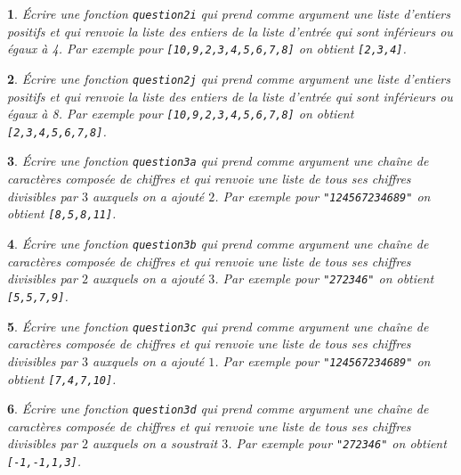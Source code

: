 \documentclass[10pt]{article}
\newtheorem{exi}{}
\newenvironment{exo}{\begin{exi}\em}{\end{exi}}
\begin{document}
\vspace*{-2ex}
\begin{exo}
    Écrire une fonction {\tt question2i} qui prend comme argument une liste d'entiers positifs et qui renvoie la liste des entiers de la liste d'entrée qui sont
inférieurs ou égaux à 4. Par exemple pour \verb+[10,9,2,3,4,5,6,7,8]+
on obtient \verb+[2,3,4]+.
\end{exo}
\vspace*{-2ex}
\begin{exo}
    Écrire une fonction {\tt question2j} qui prend comme argument une liste d'entiers positifs et qui renvoie la liste des entiers de la liste d'entrée qui sont
inférieurs ou égaux à 8. Par exemple pour \verb+[10,9,2,3,4,5,6,7,8]+
on obtient \verb+[2,3,4,5,6,7,8]+.
\end{exo}
\vspace*{-2ex}
\begin{exo}
    Écrire une fonction {\tt question3a} qui prend comme argument une chaîne de
caractères composée de chiffres
et qui renvoie une liste de tous ses chiffres divisibles par $3$
auxquels on a ajouté $2$. Par
exemple pour \verb+"124567234689"+ on obtient \verb+[8,5,8,11]+.
\end{exo}
\vspace*{-2ex}
\begin{exo}
    Écrire une fonction {\tt question3b} qui prend comme argument une chaîne de
caractères composée de chiffres
et qui renvoie une liste de tous ses chiffres divisibles par $2$
auxquels on a ajouté $3$. Par
exemple pour \verb+"272346"+ on obtient \verb+[5,5,7,9]+.
\end{exo}
\vspace*{-2ex}
\begin{exo}
    Écrire une fonction {\tt question3c} qui prend comme argument une chaîne de
caractères composée de chiffres
et qui renvoie une liste de tous ses chiffres divisibles par $3$
auxquels on a ajouté $1$. Par
exemple pour \verb+"124567234689"+ on obtient \verb+[7,4,7,10]+.
\end{exo}
\vspace*{-2ex}
\begin{exo}
    Écrire une fonction {\tt question3d} qui prend comme argument une chaîne de
caractères composée de chiffres
et qui renvoie une liste de tous ses chiffres divisibles par $2$
auxquels on a soustrait $3$. Par
exemple pour \verb+"272346"+ on obtient \verb+[-1,-1,1,3]+.
\end{exo}
\vspace*{-2ex}
\end{document}
